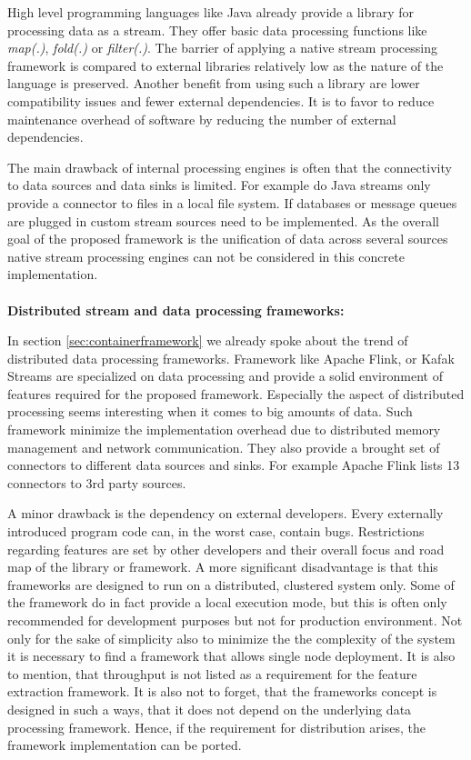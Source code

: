\noindent High level programming languages like Java already provide a library for processing data as a stream\cite{urma_2017}. They offer basic data processing functions like \textit{map(.)}, \textit{fold(.)} or \textit{filter(.)}. The barrier of applying a native stream processing framework is compared to external libraries relatively low as the nature of the language is preserved. Another benefit from using such a library are lower compatibility issues and fewer external dependencies. It is to favor to reduce maintenance overhead of software by reducing the number of external dependencies. 

The main drawback of internal processing engines is often that the connectivity to data sources and data sinks is limited. For example do Java streams only provide a connector to files in a local file system. If databases or message queues are plugged in custom stream sources need to be implemented. As the overall goal of the proposed framework is the unification of data across several sources native stream processing engines can not be considered in this concrete implementation.
\\\\
\textbf{Distributed stream and data processing frameworks:}

\noindent In section \ref{sec:containerframework} we already spoke about the trend of distributed data processing frameworks. Framework like Apache Flink, or Kafak Streams are specialized on data processing and provide a solid environment of features required for the proposed framework. Especially the aspect of distributed processing seems interesting when it comes to big amounts of data. Such framework minimize the implementation overhead due to distributed memory management and network communication. They also provide a brought set of connectors to different data sources and sinks. For example Apache Flink lists 13 connectors to 3rd party sources\cite{flink_streaming_2017}. 

A minor drawback is the dependency on external developers. Every externally introduced program code can, in the worst case, contain bugs. Restrictions regarding features are set by other developers and their overall focus and road map of the library or framework. A more significant disadvantage is that this frameworks are designed to run on a distributed, clustered system only. Some of the framework do in fact provide a local execution mode, but this is often only recommended for development purposes but not for production environment. Not only for the sake of simplicity also to minimize the the complexity of the system it is necessary to find a framework that allows single node deployment. It is also to mention, that throughput is not listed as a requirement for the feature extraction framework. It is also not to forget, that the frameworks concept is designed in such a ways, that it does not depend on the underlying data processing framework. Hence, if the requirement for distribution arises, the framework implementation can be ported.
\\\\

